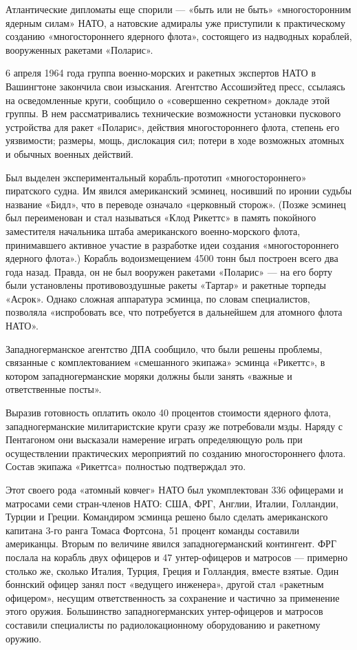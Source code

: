 \documentclass[12pt, a4paper, openany]{book}
\begin{document}
	Атлантические дипломаты еще спорили — «быть или не быть» «многосторонним ядерным силам» НАТО, а натовские адмиралы уже приступили к практическому созданию «многостороннего ядерного флота», состоящего из надводных кораблей, вооруженных ракетами «Поларис».
	
	6 апреля 1964 года группа военно-морских и ракетных экспертов НАТО в Вашингтоне закончила свои изыскания. Агентство Ассошиэйтед пресс, ссылаясь на осведомленные круги, сообщило о «совершенно секретном» докладе этой группы. В нем рассматривались технические возможности установки пускового устройства для ракет «Поларис», действия многостороннего флота, степень его уязвимости; размеры, мощь, дислокация сил; потери в ходе возможных атомных и обычных военных действий.
	
	Был выделен экспериментальный корабль-прототип «многостороннего» пиратского судна. Им явился американский эсминец, носивший по иронии судьбы название «Бидл», что в переводе означало «церковный сторож». (Позже эсминец был переименован и стал называться «Клод Рикеттс» в память покойного заместителя начальника штаба американского военно-морского флота, принимавшего активное участие в разработке идеи создания «многостороннего ядерного флота».) Корабль водоизмещением 4500 тонн был построен всего два года назад. Правда, он не был вооружен ракетами «Поларис» — на его борту были установлены противовоздушные ракеты «Тартар» и ракетные торпеды «Асрок». Однако сложная аппаратура эсминца, по словам специалистов, позволяла «испробовать все, что потребуется в дальнейшем для атомного флота НАТО».
	
	
	Западногерманское агентство ДПА сообщило, что были решены проблемы, связанные с комплектованием «смешанного экипажа» эсминца «Рикеттс», в котором западногерманские моряки должны были занять «важные и ответственные посты».
	
	Выразив готовность оплатить около 40 процентов стоимости ядерного флота, западногерманские милитаристские круги сразу же потребовали мзды. Наряду с Пентагоном они высказали намерение играть определяющую роль при осуществлении практических мероприятий по созданию многостороннего флота. Состав экипажа «Рикеттса» полностью подтверждал это.
	
	Этот своего рода «атомный ковчег» НАТО был укомплектован 336 офицерами и матросами семи стран-членов НАТО: США, ФРГ, Англии, Италии, Голландии, Турции и Греции. Командиром эсминца решено было сделать американского капитана 3-го ранга Томаса Фортсона, 51 процент команды составили американцы. Вторым по величине явился западногерманский контингент. ФРГ послала на корабль двух офицеров и 47 унтер-офицеров и матросов — примерно столько же, сколько Италия, Турция, Греция и Голландия, вместе взятые. Один боннский офицер занял пост «ведущего инженера», другой стал «ракетным офицером», несущим ответственность за сохранение и частично за применение этого оружия. Большинство западногерманских унтер-офицеров и матросов составили специалисты по радиолокационному оборудованию и ракетному оружию.
	
\end{document}
